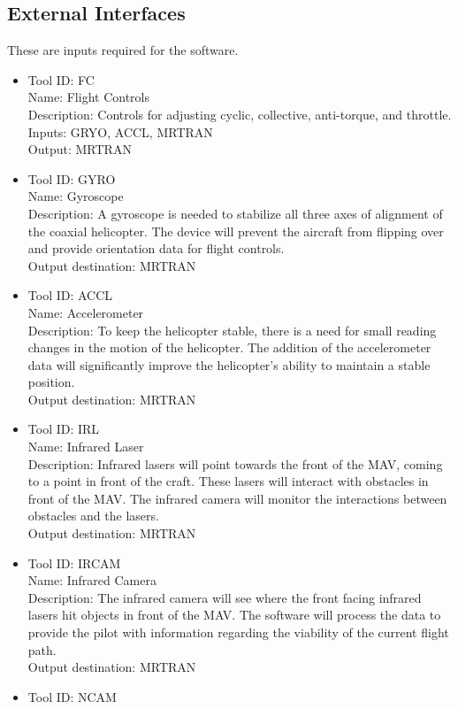 \documentclass[onecolumn, draftclsnofoot, 10pt, compsoc]{IEEEtran}
\begin{document}
\subsection{External Interfaces}
These are inputs required for the software.
\begin{itemize}
    \item Tool ID: FC\\
Name: Flight Controls\\
Description: Controls for adjusting cyclic, collective, anti-torque, and throttle.\\
Inputs: GRYO, ACCL, MRTRAN\\
Output: MRTRAN
\item Tool ID: GYRO\\
Name: Gyroscope\\
Description: A gyroscope is needed to stabilize all three axes of alignment of the coaxial helicopter. The device will prevent the aircraft from flipping over and provide orientation data for flight controls.\\
Output destination: MRTRAN
\item Tool ID: ACCL\\
Name: Accelerometer\\
Description: To keep the helicopter stable, there is a need for small reading changes in the motion of the helicopter. The addition of the accelerometer data will significantly improve the helicopter’s ability to maintain a stable position.\\
Output destination: MRTRAN
\item Tool ID: IRL\\
Name: Infrared Laser\\
Description: Infrared lasers will point towards the front of the MAV, coming to a point in front of the craft. These lasers will interact with obstacles in front of the MAV.  The infrared camera will monitor the interactions between obstacles and the lasers.\\
Output destination: MRTRAN
\item Tool ID: IRCAM\\
Name: Infrared Camera\\
Description: The infrared camera will see where the front facing infrared lasers hit objects in front of the MAV. The software will process the data to provide the pilot with information regarding the viability of the current flight path.\\
Output destination: MRTRAN
\item Tool ID: NCAM\\

\end{itemize}
\end{document}
